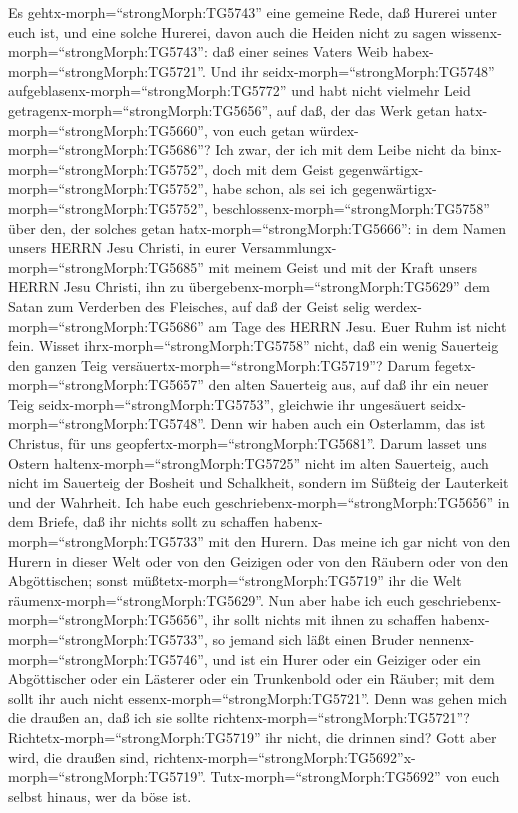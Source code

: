  Es gehtx-morph=``strongMorph:TG5743'' eine gemeine Rede,
daß Hurerei unter euch ist, und eine solche Hurerei, davon auch die
Heiden nicht zu sagen wissenx-morph=``strongMorph:TG5743'': daß einer
seines Vaters Weib habex-morph=``strongMorph:TG5721''.  Und
ihr seidx-morph=``strongMorph:TG5748''
aufgeblasenx-morph=``strongMorph:TG5772'' und habt nicht vielmehr Leid
getragenx-morph=``strongMorph:TG5656'', auf daß, der das Werk getan
hatx-morph=``strongMorph:TG5660'', von euch getan
würdex-morph=``strongMorph:TG5686''?  Ich zwar, der ich mit
dem Leibe nicht da binx-morph=``strongMorph:TG5752'', doch mit dem Geist
gegenwärtigx-morph=``strongMorph:TG5752'', habe schon, als sei ich
gegenwärtigx-morph=``strongMorph:TG5752'',
beschlossenx-morph=``strongMorph:TG5758'' über den, der solches getan
hatx-morph=``strongMorph:TG5666'':  in dem Namen unsers
HERRN Jesu Christi, in eurer Versammlungx-morph=``strongMorph:TG5685''
mit meinem Geist und mit der Kraft unsers HERRN Jesu Christi,
 ihn zu übergebenx-morph=``strongMorph:TG5629'' dem Satan
zum Verderben des Fleisches, auf daß der Geist selig
werdex-morph=``strongMorph:TG5686'' am Tage des HERRN Jesu. 
Euer Ruhm ist nicht fein. Wisset ihrx-morph=``strongMorph:TG5758''
nicht, daß ein wenig Sauerteig den ganzen Teig
versäuertx-morph=``strongMorph:TG5719''?  Darum
fegetx-morph=``strongMorph:TG5657'' den alten Sauerteig aus, auf daß ihr
ein neuer Teig seidx-morph=``strongMorph:TG5753'', gleichwie ihr
ungesäuert seidx-morph=``strongMorph:TG5748''. Denn wir haben auch ein
Osterlamm, das ist Christus, für uns
geopfertx-morph=``strongMorph:TG5681''.  Darum lasset uns
Ostern haltenx-morph=``strongMorph:TG5725'' nicht im alten Sauerteig,
auch nicht im Sauerteig der Bosheit und Schalkheit, sondern im Süßteig
der Lauterkeit und der Wahrheit.  Ich habe euch
geschriebenx-morph=``strongMorph:TG5656'' in dem Briefe, daß ihr nichts
sollt zu schaffen habenx-morph=``strongMorph:TG5733'' mit den Hurern.
 Das meine ich gar nicht von den Hurern in dieser Welt oder
von den Geizigen oder von den Räubern oder von den Abgöttischen; sonst
müßtetx-morph=``strongMorph:TG5719'' ihr die Welt
räumenx-morph=``strongMorph:TG5629''.  Nun aber habe ich
euch geschriebenx-morph=``strongMorph:TG5656'', ihr sollt nichts mit
ihnen zu schaffen habenx-morph=``strongMorph:TG5733'', so jemand sich
läßt einen Bruder nennenx-morph=``strongMorph:TG5746'', und ist ein
Hurer oder ein Geiziger oder ein Abgöttischer oder ein Lästerer oder ein
Trunkenbold oder ein Räuber; mit dem sollt ihr auch nicht
essenx-morph=``strongMorph:TG5721''.  Denn was gehen mich
die draußen an, daß ich sie sollte
richtenx-morph=``strongMorph:TG5721''?
Richtetx-morph=``strongMorph:TG5719'' ihr nicht, die drinnen sind?
 Gott aber wird, die draußen sind,
richtenx-morph=``strongMorph:TG5692''\textbar x-morph=``strongMorph:TG5719''.
Tutx-morph=``strongMorph:TG5692'' von euch selbst hinaus, wer da böse
ist.

